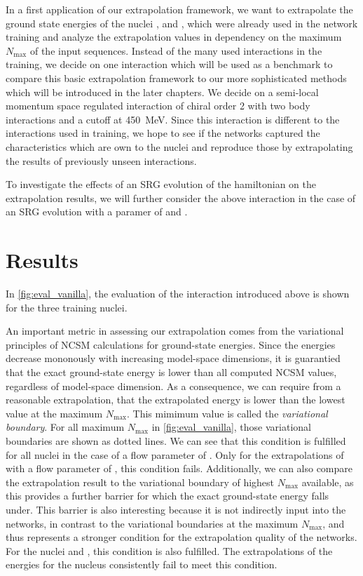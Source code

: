 In a first application of our extrapolation framework, we want to extrapolate the ground state energies of the nuclei ,  and , which were already used in the network training and analyze the extrapolation values in dependency on the maximum $N_\mathrm{max}$ of the input sequences. Instead of the many used interactions in the training, we decide on one interaction which will be used as a benchmark to compare this basic extrapolation framework to our more sophisticated methods which will be introduced in the later chapters. We decide on a semi-local momentum space regulated interaction of chiral order 2 with two body interactions and a cutoff at \SI{450}{\mega\electronvolt}. Since this interaction is different to the interactions used in training, we hope to see if the networks captured the characteristics which are own to the nuclei and reproduce those by extrapolating the results of previously unseen interactions.

To investigate the effects of an SRG evolution of the hamiltonian on the extrapolation results, we will further consider the above interaction in the case of an SRG evolution with a paramer of  and .

\section{Results}
In \autoref{fig:eval_vanilla}, the evaluation of the interaction introduced above is shown for the three training nuclei.

An important metric in assessing our extrapolation comes from the variational principles of NCSM calculations for ground-state energies. Since the energies decrease mononously with increasing model-space dimensions, it is guarantied that the exact ground-state energy is lower than all computed NCSM values, regardless of model-space dimension. As a consequence, we can require from a reasonable extrapolation, that the extrapolated energy is lower than the lowest value at the maximum $N_\mathrm{max}$. This mimimum value is called the \textit{variational boundary}. For all maximum $N_\mathrm{max}$ in \autoref{fig:eval_vanilla}, those variational boundaries are shown as dotted lines. We can see that this condition is fulfilled for all nuclei in the case of a flow parameter of . Only for the extrapolations of  with a flow parameter of , this condition fails. Additionally, we can also compare the extrapolation result to the variational boundary of highest $N_\mathrm{max}$ available, as this provides a further barrier for which the exact ground-state energy falls under. This barrier is also interesting because it is not indirectly input into the networks, in contrast to the variational boundaries at the maximum $N_\mathrm{max}$, and thus represents a stronger condition for the extrapolation quality of the networks. For the nuclei  and , this condition is also fulfilled. The extrapolations of the energies for the  nucleus consistently fail to meet this condition.

